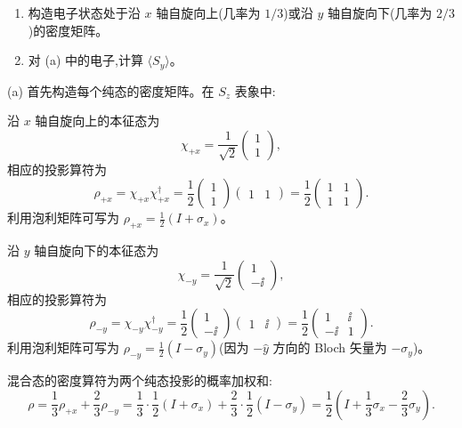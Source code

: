 \begin{question}
\begin{enumerate}
\item 构造电子状态处于沿 $x$ 轴自旋向上(几率为 $1/3$)或沿 $y$ 轴自旋向下(几率为 $2/3$)的密度矩阵。
\item 对 (a) 中的电子,计算 $\langle S_y\rangle$。
\end{enumerate}
\end{question}
\begin{solution}
(a) 首先构造每个纯态的密度矩阵。在 $S_z$ 表象中:

沿 $x$ 轴自旋向上的本征态为
\[
\chi_{+x} = \frac{1}{\sqrt{2}}\begin{pmatrix}1\\1\end{pmatrix},
\]
相应的投影算符为
\[
\rho_{+x} = \chi_{+x}\chi_{+x}^\dagger
= \frac{1}{2}\begin{pmatrix}1\\1\end{pmatrix}\begin{pmatrix}1&1\end{pmatrix}
= \frac{1}{2}\begin{pmatrix}1&1\\1&1\end{pmatrix}.
\]
利用泡利矩阵可写为 $\rho_{+x} = \frac{1}{2}(I+\sigma_x)$。

沿 $y$ 轴自旋向下的本征态为
\[
\chi_{-y} = \frac{1}{\sqrt{2}}\begin{pmatrix}1\\-\ii\end{pmatrix},
\]
相应的投影算符为
\[
\rho_{-y} = \chi_{-y}\chi_{-y}^\dagger
= \frac{1}{2}\begin{pmatrix}1\\-\ii\end{pmatrix}\begin{pmatrix}1&\ii\end{pmatrix}
= \frac{1}{2}\begin{pmatrix}1&\ii\\-\ii&1\end{pmatrix}.
\]
利用泡利矩阵可写为 $\rho_{-y} = \frac{1}{2}(I-\sigma_y)$(因为 $-\hat y$ 方向的 Bloch 矢量为 $-\sigma_y$)。

混合态的密度算符为两个纯态投影的概率加权和:
\[
\rho = \frac{1}{3}\rho_{+x} + \frac{2}{3}\rho_{-y}
= \frac{1}{3}\cdot\frac{1}{2}(I+\sigma_x) + \frac{2}{3}\cdot\frac{1}{2}(I-\sigma_y)
= \frac{1}{2}\left(I + \frac{1}{3}\sigma_x - \frac{2}{3}\sigma_y\right).
\]


\end{solution}
